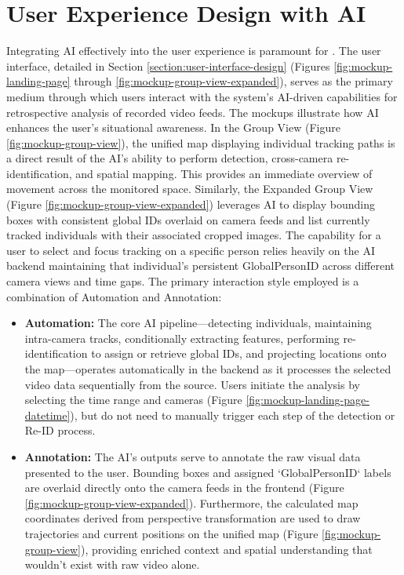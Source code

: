 \section{User Experience Design with AI}
\label{section:ux_design} %
Integrating AI effectively into the user experience is paramount for \usevar{\srsTitle}. The user interface, detailed in Section \ref{section:user-interface-design} (Figures \ref{fig:mockup-landing-page} through \ref{fig:mockup-group-view-expanded}), serves as the primary medium through which users interact with the system's AI-driven capabilities for retrospective analysis of recorded video feeds.
The mockups illustrate how AI enhances the user's situational awareness. In the Group View (Figure \ref{fig:mockup-group-view}), the unified map displaying individual tracking paths is a direct result of the AI's ability to perform detection, cross-camera re-identification, and spatial mapping. This provides an immediate overview of movement across the monitored space. Similarly, the Expanded Group View (Figure \ref{fig:mockup-group-view-expanded}) leverages AI to display bounding boxes with consistent global IDs overlaid on camera feeds and list currently tracked individuals with their associated cropped images. The capability for a user to select and focus tracking on a specific person relies heavily on the AI backend maintaining that individual's persistent GlobalPersonID across different camera views and time gaps.
The primary interaction style employed is a combination of Automation and Annotation:
\begin{itemize}
    \item \textbf{Automation:} The core AI pipeline—detecting individuals, maintaining intra-camera tracks, conditionally extracting features, performing re-identification to assign or retrieve global IDs, and projecting locations onto the map—operates automatically in the backend as it processes the selected video data sequentially from the source. Users initiate the analysis by selecting the time range and cameras (Figure \ref{fig:mockup-landing-page-datetime}), but do not need to manually trigger each step of the detection or Re-ID process. %
    \item \textbf{Annotation:} The AI's outputs serve to annotate the raw visual data presented to the user. Bounding boxes and assigned `GlobalPersonID` labels are overlaid directly onto the camera feeds in the frontend (Figure \ref{fig:mockup-group-view-expanded}). Furthermore, the calculated map coordinates derived from perspective transformation are used to draw trajectories and current positions on the unified map (Figure \ref{fig:mockup-group-view}), providing enriched context and spatial understanding that wouldn't exist with raw video alone.
\end{itemize}
